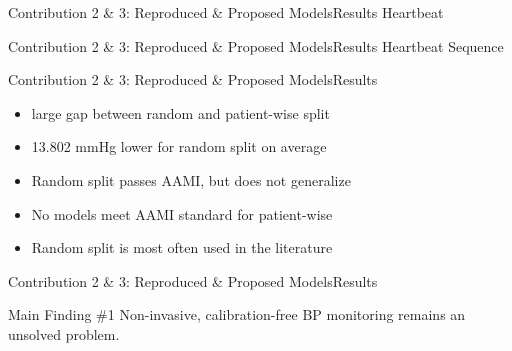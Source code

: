 \begin{frame}{Contribution 2 \& 3: Reproduced \& Proposed Models}{Results}
    \centering
    Heartbeat
    \begin{figure}
        
        \hfill
        
    \end{figure}
\end{frame}


\begin{frame}{Contribution 2 \& 3: Reproduced \& Proposed Models}{Results}
    \centering
    Heartbeat Sequence
    \begin{figure}
        
        \hfill
        
    \end{figure}
\end{frame}

\begin{frame}{Contribution 2 \& 3: Reproduced \& Proposed Models}{Results}
    \begin{itemize}
        \item large gap between random and patient-wise split
        \item 13.802 mmHg lower for random split on average
        \item Random split passes AAMI, but does not generalize
        \item No models meet AAMI standard for patient-wise
        \item Random split is most often used in the literature
    \end{itemize}
\end{frame}

\begin{frame}{Contribution 2 \& 3: Reproduced \& Proposed Models}{Results}
    \begin{block}{Main Finding \#1}
        Non-invasive, calibration-free BP monitoring remains an unsolved problem.
    \end{block}
\end{frame}

